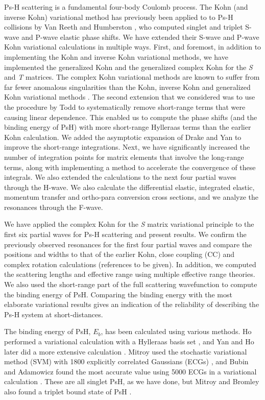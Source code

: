 \documentclass[preprint,showpacs,preprintnumbers,amsmath,amssymb,longbibliography,pra,aps]{revtex4-1}
\begin{document}
Ps-H scattering is a fundamental four-body Coulomb process. The Kohn (and inverse Kohn) variational method has previously been applied to
to Ps-H collisions by Van Reeth and Humberston \cite{VanReeth2003,VanReeth2004}, who computed singlet and triplet
S-wave and P-wave elastic phase shifts. 
We have extended their S-wave and P-wave Kohn variational calculations in multiple ways.
First, and foremost, in addition to implementing
the Kohn and inverse Kohn variational methods, we have
implemented the generalized Kohn and the generalized complex Kohn
for the \emph{S} and \emph{T} matrices. 
The complex Kohn variational methods are known to suffer
from far fewer anomalous singularities than the
Kohn, inverse Kohn and generalized Kohn variational methods \cite{Lucchese1989, Cooper2009, Cooper2010}. 
The second extension that we considered was to use
the procedure by Todd to systematically remove short-range terms that
were causing linear dependence.
This enabled us to compute the phase shifts (and the binding
energy of PsH) with more short-range Hylleraas terms than the earlier 
Kohn calculation. We added the asymptotic expansion of Drake and Yan \cite{Drake1995, Yan1997} to improve the short-range integrations.
Next, we have significantly increased the number of integration points for matrix elements that involve the long-range terms, along with implementing a method to accelerate the convergence of these integrals. We also extended the calculations to the next four partial waves through the H-wave. We also calculate the differential elastic, integrated elastic, momentum transfer and ortho-para conversion cross sections, and we analyze the resonances through the F-wave.

We have applied the complex Kohn for the \emph{S} matrix variational principle to the first six partial waves for Ps-H scattering and present results. We confirm the previously observed resonances for the first four partial waves and compare the positions and widths to that of the earlier Kohn, close coupling (CC) and complex rotation calculations (references to be given). In addition, we computed the scattering lengths and effective range using multiple effective range theories. We also used the short-range part of the full scattering wavefunction to compute the binding energy of PsH. Comparing the binding energy with the most elaborate variational results gives an indication of the reliability of describing the Ps-H system at short-distances.

The binding energy of PsH, $E_b$, has been calculated using various methods. Ho performed a variational calculation with a Hylleraas basis set \cite{Ho1986}, and Yan and Ho later did a more extensive calculation \cite{Yan1999}. Mitroy used the stochastic variational method (SVM) with 1800 explicitly correlated Gaussians (ECGs) \cite{Mitroy2006}, and Bubin and Adamowicz found the most accurate value using 5000 ECGs in a variational calculation \cite{Bubin2006}. These are all singlet PsH, as we have done, but Mitroy and Bromley also found a triplet bound state of PsH \cite{Mitroy2007}.
\end{document}
